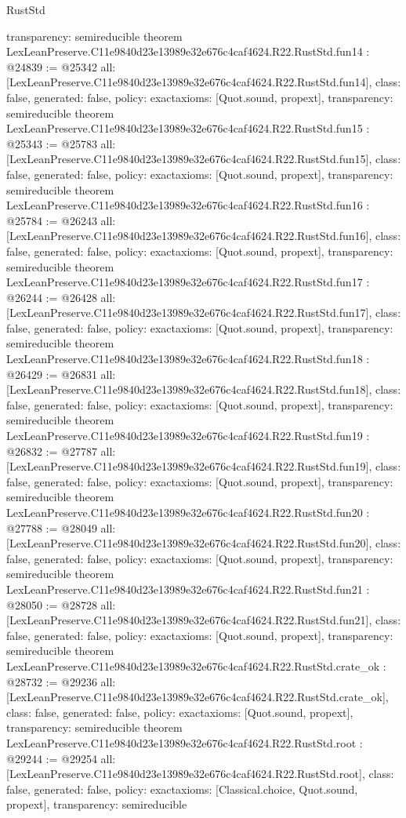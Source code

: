 \begin{lexlean}{RustStd}
\begin{coremodule}
{  transparency: semireducible
}
theorem LexLeanPreserve.C11e9840d23e13989e32e676c4caf4624.R22.RustStd.fun14 : @24839 := @25342 {
  all: [LexLeanPreserve.C11e9840d23e13989e32e676c4caf4624.R22.RustStd.fun14],
  class: false,
  generated: false,
  policy: exact{axioms: [Quot.sound, propext]},
  transparency: semireducible
}
theorem LexLeanPreserve.C11e9840d23e13989e32e676c4caf4624.R22.RustStd.fun15 : @25343 := @25783 {
  all: [LexLeanPreserve.C11e9840d23e13989e32e676c4caf4624.R22.RustStd.fun15],
  class: false,
  generated: false,
  policy: exact{axioms: [Quot.sound, propext]},
  transparency: semireducible
}
theorem LexLeanPreserve.C11e9840d23e13989e32e676c4caf4624.R22.RustStd.fun16 : @25784 := @26243 {
  all: [LexLeanPreserve.C11e9840d23e13989e32e676c4caf4624.R22.RustStd.fun16],
  class: false,
  generated: false,
  policy: exact{axioms: [Quot.sound, propext]},
  transparency: semireducible
}
theorem LexLeanPreserve.C11e9840d23e13989e32e676c4caf4624.R22.RustStd.fun17 : @26244 := @26428 {
  all: [LexLeanPreserve.C11e9840d23e13989e32e676c4caf4624.R22.RustStd.fun17],
  class: false,
  generated: false,
  policy: exact{axioms: [Quot.sound, propext]},
  transparency: semireducible
}
theorem LexLeanPreserve.C11e9840d23e13989e32e676c4caf4624.R22.RustStd.fun18 : @26429 := @26831 {
  all: [LexLeanPreserve.C11e9840d23e13989e32e676c4caf4624.R22.RustStd.fun18],
  class: false,
  generated: false,
  policy: exact{axioms: [Quot.sound, propext]},
  transparency: semireducible
}
theorem LexLeanPreserve.C11e9840d23e13989e32e676c4caf4624.R22.RustStd.fun19 : @26832 := @27787 {
  all: [LexLeanPreserve.C11e9840d23e13989e32e676c4caf4624.R22.RustStd.fun19],
  class: false,
  generated: false,
  policy: exact{axioms: [Quot.sound, propext]},
  transparency: semireducible
}
theorem LexLeanPreserve.C11e9840d23e13989e32e676c4caf4624.R22.RustStd.fun20 : @27788 := @28049 {
  all: [LexLeanPreserve.C11e9840d23e13989e32e676c4caf4624.R22.RustStd.fun20],
  class: false,
  generated: false,
  policy: exact{axioms: [Quot.sound, propext]},
  transparency: semireducible
}
theorem LexLeanPreserve.C11e9840d23e13989e32e676c4caf4624.R22.RustStd.fun21 : @28050 := @28728 {
  all: [LexLeanPreserve.C11e9840d23e13989e32e676c4caf4624.R22.RustStd.fun21],
  class: false,
  generated: false,
  policy: exact{axioms: [Quot.sound, propext]},
  transparency: semireducible
}
theorem LexLeanPreserve.C11e9840d23e13989e32e676c4caf4624.R22.RustStd.crate_ok : @28732 := @29236 {
  all: [LexLeanPreserve.C11e9840d23e13989e32e676c4caf4624.R22.RustStd.crate_ok],
  class: false,
  generated: false,
  policy: exact{axioms: [Quot.sound, propext]},
  transparency: semireducible
}
theorem LexLeanPreserve.C11e9840d23e13989e32e676c4caf4624.R22.RustStd.root : @29244 := @29254 {
  all: [LexLeanPreserve.C11e9840d23e13989e32e676c4caf4624.R22.RustStd.root],
  class: false,
  generated: false,
  policy: exact{axioms: [Classical.choice, Quot.sound, propext]},
  transparency: semireducible
}


\end{coremodule}
\end{lexlean}
